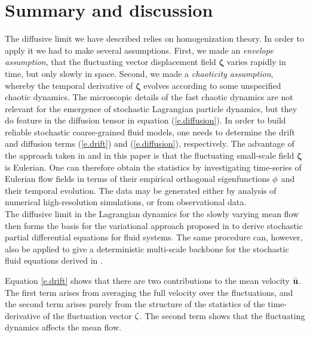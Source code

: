 \documentclass[12pt,onesided]{article}
\def\MM#1{{\bf{#1}}}
\def\bphi{{\MM{\phi}}}
\def\u{{\bf{u}}}
\def\bzeta{{\bm{\zeta}}}
\begin{document}
\section{Summary and discussion}
\label{sec.summary}
The diffusive limit we have described relies on homogenization theory. In order to apply it we had to make several assumptions. First, we made an \emph{envelope assumption}, that the fluctuating vector displacement field $\bzeta$  varies rapidly in time, but only slowly in space. Second, we made a \emph{chaoticity assumption}, whereby the temporal derivative of $\bzeta$ evolves according to some unspecified chaotic dynamics. The microscopic details of the fast chaotic dynamics are not relevant for the emergence of stochastic Lagrangian particle dynamics, but they do feature in the diffusion tensor in equation (\ref{e.diffusion}). In order to build reliable stochastic coarse-grained fluid models, one needs to determine the drift and diffusion terms (\ref{e.drift}) and (\ref{e.diffusion}), respectively. The advantage of the approach taken in \cite{Holm15,CrFlHo2017} and in this paper is that the fluctuating small-scale field $\bzeta$ is Eulerian. One can therefore obtain the statistics by investigating time-series of Eulerian flow fields in terms of their empirical orthogonal eigenfunctions $\bphi$ and their temporal evolution. The data may be generated either by analysis of  numerical high-resolution simulations, or from observational data.\\

The diffusive limit in the Lagrangian dynamics for the slowly varying
mean flow then forms the basis for the variational approach proposed
in \cite{Holm15,CrFlHo2017} to derive stochastic partial differential equations
for fluid systems. The same procedure can, however, also be applied to
give a deterministic multi-scale backbone for the stochastic fluid
equations derived in
\cite{Memin14,ResseguierEtAl17a,ResseguierEtAl17b,ResseguierEtAl17c}.

Equation \eqref{e.drift} shows that there are two contributions to
the mean velocity $\bar{{\u}}$. The first term arises from averaging the full
velocity over the fluctuations, and the second term arises purely from
the structure of the statistics of the time-derivative of the
fluctuation vector $\MM{\zeta}$. The second term shows that the
fluctuating dynamics affects the mean flow. 
\end{document}
